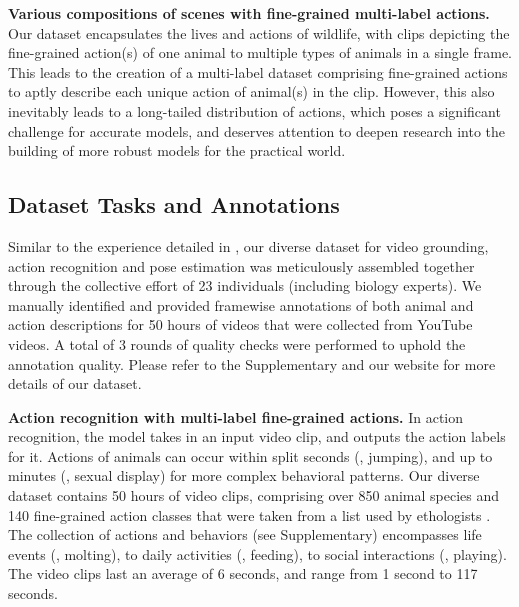 \documentclass[10pt,twocolumn,letterpaper]{article}
\begin{document}
    \textbf{Various compositions of scenes with fine-grained multi-label actions.} Our dataset encapsulates the lives and actions of wildlife, with clips depicting the fine-grained action(s) of one animal to multiple types of animals in a single frame. This leads to the creation of a multi-label dataset comprising fine-grained actions to aptly describe each unique action of animal(s) in the clip. However, this also inevitably leads to a long-tailed distribution of actions, which poses a significant challenge for accurate models, and deserves attention to deepen research into the building of more robust models for the practical world. \par
    
    
    
    \subsection{Dataset Tasks and Annotations}
    
    Similar to the experience detailed in \cite{von2021big}, our diverse dataset for video grounding, action recognition and pose estimation was meticulously assembled together through the collective effort of 23 individuals (including biology experts). We manually identified and provided framewise annotations of both animal and action descriptions for 50 hours of videos that were collected from YouTube videos. A total of 3 rounds of quality checks were performed to uphold the annotation quality. Please refer to the Supplementary and our website for more details of our dataset. 
    
    \textbf{Action recognition with multi-label fine-grained actions.} In action recognition, the model takes in an input video clip, and outputs the action labels for it. Actions of animals can occur within split seconds (\eg, jumping), and up to minutes (\eg, sexual display) for more complex behavioral patterns. Our diverse dataset contains 50 hours of video clips, comprising over 850 animal species and 140 fine-grained action classes that were taken from a list used by ethologists \cite{mouse_ethogram, stafford2011inferential, rose2021conducting, NC3RS_ethogram}. The collection of actions and behaviors (see Supplementary) encompasses life events (\eg, molting), to daily activities (\eg, feeding), to social interactions (\eg, playing). The video clips last an average of 6 seconds, and range from 1 second to 117 seconds.
    
\end{document}

